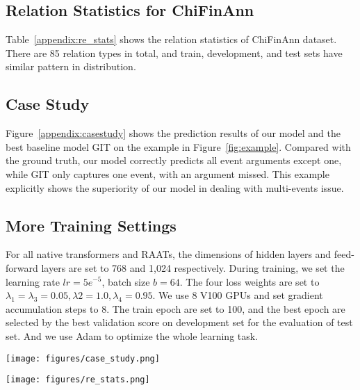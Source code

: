 \documentclass[11pt]{article}
\begin{document}
\subsection{Relation Statistics for ChiFinAnn}
\label{section:A.3}
Table~\ref{appendix:re_stats} shows the relation statistics of ChiFinAnn dataset. There are 85 relation types in total, and train, development, and test sets have similar pattern in distribution.


\subsection{Case Study}
\label{section:A.4}

Figure~\ref{appendix:casestudy} shows the prediction results of our model and the best baseline model GIT on the example in Figure~\ref{fig:example}. Compared with the ground truth, our model correctly predicts all event arguments except one, while GIT only captures one event, with an argument missed. This example explicitly shows the superiority of our model in dealing with multi-events issue.

\subsection{More Training Settings}
\label{section:A.5}
For all native transformers and RAATs, the dimensions of hidden layers and feed-forward layers are set to 768 and 1,024 respectively. During training, we set the learning rate $lr=5e^{-5}$, batch size $b=64$. The four loss weights are set to $\lambda_1 = \lambda_3 = 0.05, \lambda2 = 1.0, \lambda_4=0.95$. We use 8 V100 GPUs and set gradient accumulation steps to 8. The train epoch are set to 100, and the best epoch are selected by the best validation score on development set for the evaluation of test set. And we use Adam to optimize the whole learning task.
\begin{figure*}
    \centering
    \texttt{[image: figures/case\_study.png]}
    \caption{Case study.}
    \label{appendix:casestudy}
\end{figure*}

\begin{table*}
    \centering
    \texttt{[image: figures/re\_stats.png]}
    \caption{Relation statistics of ChiFinAnn dataset.}
    \label{appendix:re_stats}
\end{table*}
\end{document}
